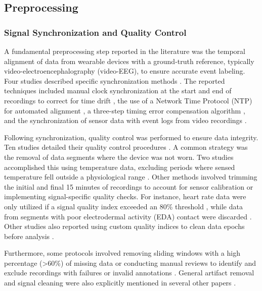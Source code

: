 \subsection{Preprocessing}

\subsubsection{Signal Synchronization and Quality Control}
A fundamental preprocessing step reported in the literature was the temporal alignment of data from wearable devices with a ground-truth reference, typically video-electroencephalography (video-EEG), to ensure accurate event labeling. Four studies described specific synchronization methods \cite{Yu2023-ss, Vakilna2024-hk, Arends2018-ew, Tang2021-td}. The reported techniques included manual clock synchronization at the start and end of recordings to correct for time drift \cite{Yu2023-ss}, the use of a Network Time Protocol (NTP) for automated alignment \cite{Vakilna2024-hk}, a three-step timing error compensation algorithm \cite{Tang2021-td}, and the synchronization of sensor data with event logs from video recordings \cite{Arends2018-ew}.

Following synchronization, quality control was performed to ensure data integrity. Ten studies detailed their quality control procedures \cite{Yu2023-ss, Li2022-ty, Arends2018-ew, Jiang2022-zu, Wang2025-my, Nasseri2021-xn, Tang2021-td, Ali2020-ke, Ge2023-ab, Hegarty-Craver2021-hk}. A common strategy was the removal of data segments where the device was not worn. Two studies accomplished this using temperature data, excluding periods where sensed temperature fell outside a physiological range \cite{Yu2023-ss, Tang2021-td}. Other methods involved trimming the initial and final 15 minutes of recordings to account for sensor calibration \cite{Yu2023-ss} or implementing signal-specific quality checks. For instance, heart rate data were only utilized if a signal quality index exceeded an 80\% threshold \cite{Arends2018-ew}, while data from segments with poor electrodermal activity (EDA) contact were discarded \cite{Li2022-ty}. Other studies also reported using custom quality indices to clean data epochs before analysis \cite{Nasseri2021-xn, Wang2025-my}.

Furthermore, some protocols involved removing sliding windows with a high percentage (>60\%) of missing data \cite{Jiang2022-zu} or conducting manual reviews to identify and exclude recordings with failures or invalid annotations \cite{Yu2023-ss}. General artifact removal and signal cleaning were also explicitly mentioned in several other papers \cite{Ge2023-ab, Hegarty-Craver2021-hk, Ali2020-ke}.


